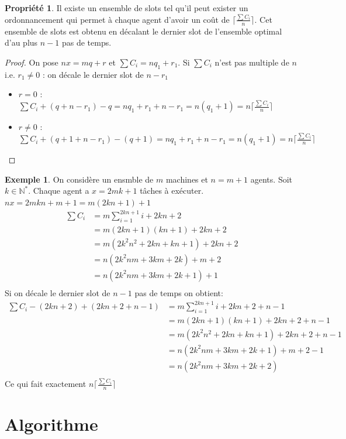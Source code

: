 \documentclass[12pt]{article}
\theoremstyle{definition}
\newtheorem{prop}{Propriété}
\newtheorem{exemple}{Exemple}
\begin{document}
\begin{prop}
Il existe un ensemble de slots tel qu'il peut exister un ordonnancement qui permet à chaque agent d'avoir un coût de $\lceil\frac{\sum C_i}{n}\rceil$. Cet ensemble de slots est obtenu en décalant le dernier slot de l'ensemble optimal d'au plus $n-1$ pas de temps.
\end{prop}
\begin{proof}
On pose $nx = mq+r$ et $\sum C_i = nq_1+r_1$. Si $\sum C_i$ n'est pas multiple de $n$ i.e. $r_1 \neq 0$ : on décale le dernier slot de $n-r_1$\\
\begin{itemize}
\item $r = 0$ : $\sum C_i + (q+n-r_1)-q = nq_1 + r_1 + n - r_1 = n(q_1 + 1) = n\lceil\frac{\sum C_i}{n}\rceil$
\item $r \neq 0$ : $\sum C_i + (q+1+n-r_1)-(q+1) = nq_1 + r_1 + n - r_1 = n(q_1 + 1) = n\lceil\frac{\sum C_i}{n}\rceil$
\end{itemize}
\end{proof}
\begin{exemple}
On considère un ensmble de $m$ machines et $n=m+1$ agents. Soit $k\in \mathbb{N}^*$. Chaque agent a $x = 2mk+1$ tâches à exécuter.\\
$nx = 2mkn + m + 1 = m(2kn+1)+1$\\
\begin{align*}
\sum C_i &= m \sum\limits_{i=1}^{2kn+1} i + 2kn +2 \\
&= m(2kn+1)(kn+1) + 2kn +2 \\
&= m(2k^2n^2+2kn+kn+1) + 2kn +2 \\
&= n(2k^2nm+3km+2k)+m+2 \\
&= n(2k^2nm+3km+2k+1)+1 \\
\end{align*}
Si on décale le dernier slot de $n-1$ pas de temps on obtient:
\begin{align*}
\sum C_i -(2kn+2)+(2kn+2+n-1)&= m \sum\limits_{i=1}^{2kn+1} i + 2kn +2 +n-1 \\
&= m(2kn+1)(kn+1) + 2kn +2 +n-1 \\
&= m(2k^2n^2+2kn+kn+1) + 2kn +2+n-1 \\
&= n(2k^2nm+3km+2k+1)+m+2-1 \\
&= n(2k^2nm+3km+2k+2) \\
\end{align*}
Ce qui fait exactement $n\lceil\frac{\sum C_i}{n}\rceil$
\end{exemple}

\section{Algorithme}
\end{document}
